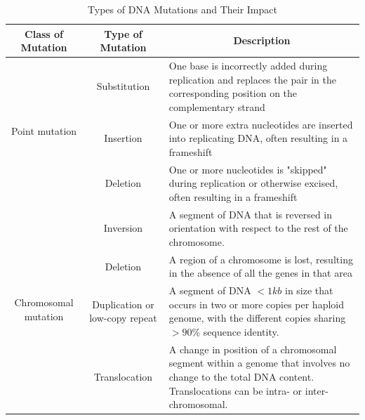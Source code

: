  \begin{landscape}
 \bgroup
 \def\arraystretch{2.0}%

 \begin{table}[]
 \centering
 \small
 \caption{Types of DNA Mutations and Their Impact \cite{comis_cnv,clancy2008genetic,feuk2006structural}}
 \label{mutation}
 \begin{tabular}{p{4cm}c|p{13cm}}
 \hline \hline
 \multicolumn{1}{c}{\textbf{Class of Mutation}} & \multicolumn{1}{c}{\textbf{Type of Mutation}} & \multicolumn{1}{c}{\textbf{Description}}  \\ \hline \hline
\multicolumn{1}{c|}{\multirow{3}{*}{\parbox{3cm}{\vspace{1.2cm} Point mutation}}}
& Substitution  & One base is incorrectly added during replication and replaces the pair in the corresponding position on the complementary strand \\  \cline{2-3}
\multicolumn{1}{c|}{}                                       & Insertion                                     & One or more extra nucleotides are inserted into replicating DNA, often resulting in a frameshift                                 \\  \cline{2-3}
\multicolumn{1}{c|}{}                                       & Deletion                                      & One or more nucleotides is "skipped" during replication or otherwise excised, often resulting in a frameshift                  \\ \hline
\multicolumn{1}{c|}{\multirow{4}{*}{\parbox{4cm}{\vspace{1.2cm} Chromosomal mutation}}}  &
Inversion  & A segment of DNA that is reversed in orientation with respect to the rest of the chromosome. \\  \cline{2-3}
\multicolumn{1}{l|}{}    & Deletion & A region of a chromosome is lost,
resulting in the absence of all the genes in that area      \\  \cline{2-3}
\multicolumn{1}{l|}{}    & Duplication   or low-copy repeat   & A segment of DNA $<1 kb$ in size that occurs in two or more copies per haploid genome, with the different copies sharing $>90\%$ sequence identity.  \\  \cline{2-3}
\multicolumn{1}{l|}{}    & Translocation   &  A change in position of a chromosomal segment within a genome that involves no change to the total DNA content. Translocations can be intra- or inter- chromosomal.   \\ \hline

\end{tabular}
\end{table}
\end{landscape}
